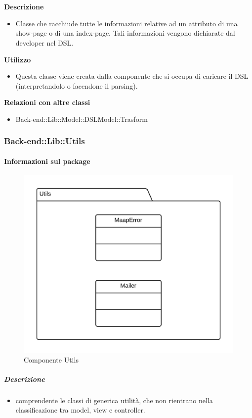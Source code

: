 				\textbf{\\ \\ Descrizione} 
					\begin{itemize}
						\item[] Classe che racchiude tutte le informazioni relative ad un attributo di una show-page o di una index-page. Tali informazioni vengono dichiarate dal developer nel DSL.
					\end{itemize}      
				\textbf{Utilizzo}  
					\begin{itemize}
						\item[] Questa classe viene creata dalla componente che si occupa di caricare il DSL (interpretandolo o facendone il parsing).
					\end{itemize}
					\textbf{Relazioni con altre classi}
					\begin{itemize}
							\item{Back-end::Lib::Model::DSLModel::Trasform}
					\end{itemize}
	\subsubsection{Back-end::Lib::Utils}
	\paragraph{Informazioni sul package} 
		\begin{figure}[H] 
			\begin{center} 
				\includegraphics[width=\textwidth]{uml/package/Back-end::Lib::Utils.png}  
				\caption{Componente Utils}
			\end{center}  
		\end{figure} 
	\subparagraph{Descrizione} 
		\begin{itemize}
		\item[]  comprendente le classi di generica utilità, che non rientrano nella classificazione tra model, view e controller.
		\end{itemize} 
